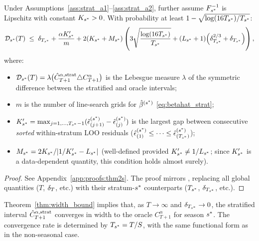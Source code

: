 \begin{theorem}
\label{thm:width_bound}
Under Assumptions~\ref{ass:strat_a1}--\ref{ass:strat_a2},
further assume $F_{s^*}^{-1}$ is Lipschitz with constant
$K_{s^*} > 0$.  With probability at least
$1 - \sqrt{\log(16T_{s^*})/T_{s^*}}$:
\begin{equation}
  \label{eq:width_bound}
  \mathcal{D}_{s^*}(T)
  \;\leq\;
  \delta_{T_{s^*}}
  + \frac{\alpha K'_{s^*}}{m}
  + 2(K_{s^*} + M_{s^*})
  \left(
    3\sqrt{\frac{\log(16T_{s^*})}{T_{s^*}}}
    + (L_{s^*}+1)\!\left(\delta_{T_{s^*}}^{2/3}+\delta_{T_{s^*}}\right)
  \right),
\end{equation}
where:
\begin{itemize}
  \item $\mathcal{D}_{s^*}(T) = \lambda\bigl(\hat{C}_{T+1}^{\alpha,\textup{strat}}
    \triangle C_{T+1}^{\alpha}\bigr)$ is the Lebesgue measure
    $\lambda$ of the symmetric difference between the stratified
    and oracle intervals;
  \item $m$ is the number of line-search grids for
    $\hat{\beta}^{(s^*)}$ \eqref{eq:betahat_strat};
  \item $K'_{s^*} = \max_{j=1,\ldots,T_{s^*}-1}
    (\hat{\epsilon}_{(j+1)}^{(s^*)} - \hat{\epsilon}_{(j)}^{(s^*)})$
    is the largest gap between consecutive \emph{sorted}
    within-stratum LOO residuals
    ($\hat{\epsilon}_{(1)}^{(s^*)} \leq \cdots \leq
      \hat{\epsilon}_{(T_{s^*})}^{(s^*)}$);
  \item $M_{s^*} = 2K_{s^*}/|1/K'_{s^*} - L_{s^*}|$
    (well-defined provided $K'_{s^*} \neq 1/L_{s^*}$; since
    $K'_{s^*}$ is a data-dependent quantity, this condition holds
    almost surely).
\end{itemize}
\end{theorem}

\begin{proof}
  See Appendix~\ref{app:proofs:thm2s}.  The proof mirrors
  \citet[Theorem~3]{xu2023conformal}, replacing all global
  quantities ($T$, $\delta_T$, etc.) with their stratum-$s^*$
  counterparts ($T_{s^*}$, $\delta_{T_{s^*}}$, etc.).
\end{proof}

\begin{remark}
  Theorem~\ref{thm:width_bound} implies that, as $T \to \infty$
  and $\delta_{T_{s^*}} \to 0$, the stratified interval
  $\hat{C}_{T+1}^{\alpha,\textup{strat}}$ converges in width
  to the oracle $C_{T+1}^{\alpha}$ for season $s^*$.  The
  convergence rate is determined by $T_{s^*} = T/S$, with the
  same functional form as in the non-seasonal case.
\end{remark}

